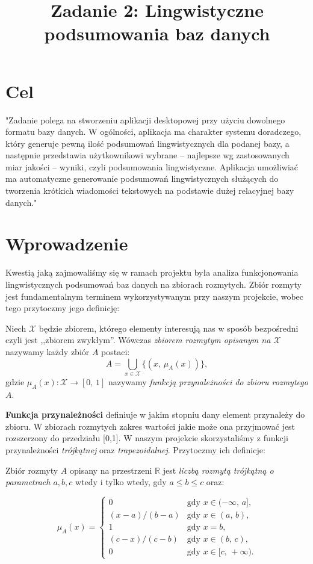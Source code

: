 \documentclass{classrep}
\author{
  \studentinfo{Piotr Traczyk}{195733} \and
  \studentinfo{Bartosz Jurczewski}{210209}
}
\title{Zadanie 2: Lingwistyczne podsumowania baz danych}
\begin{document}
\maketitle


\section{Cel}
"Zadanie polega na stworzeniu aplikacji desktopowej przy użyciu dowolnego formatu bazy danych. W ogólności, aplikacja ma charakter systemu doradczego, który generuje pewną ilość podsumowań lingwistycznych dla podanej bazy, a następnie przedstawia użytkownikowi wybrane – najlepsze wg zastosowanych miar jakości – wyniki, czyli podsumowania lingwistyczne. Aplikacja umożliwiać ma automatyczne generowanie podsumowań lingwistycznych służących do tworzenia krótkich wiadomości tekstowych na podstawie dużej relacyjnej bazy danych." \cite{tresc}

\section{Wprowadzenie}
Kwestią jaką zajmowaliśmy się w ramach projektu była analiza funkcjonowania lingwistycznych podsumowań baz danych na zbiorach rozmytych. Zbiór rozmyty jest fundamentalnym terminem wykorzystywanym przy naszym projekcie, wobec tego przytoczmy jego definicję:

\begin{definition}Niech \(\mathcal{X}\) będzie zbiorem, którego elementy interesują
nas w sposób bezpośredni czyli jest ,,zbiorem zwykłym''.
Wówczas \emph{zbiorem rozmytym opisanym na \(\mathcal{X}\)}
nazywamy każdy zbiór \(A\) postaci:
\[A = \bigcup_{x \in \mathcal{X}} \{(x,\, \mu_A(x))\},\]
gdzie \(\mu_A(x) : \mathcal{X} \to [0,\,1]\) nazywamy \emph{funkcją
przynależności do zbioru rozmytego \(A\)}.
\end{definition}

\textbf{Funkcja przynależności} definiuje w jakim stopniu dany element przynależy do zbioru. W zbiorach rozmytych zakres wartości jakie może ona przyjmować jest rozszerzony do przedziału [0,1]. W naszym projekcie skorzystaliśmy z funkcji przynależności \emph{trójkątnej} oraz \emph{trapezoidalnej}. Przytoczmy ich definicje:

\begin{definition}
Zbiór rozmyty \(A\) opisany na przestrzeni \(\mathbb{R}\) jest
\emph{liczbą rozmytą trójkątną o parametrach \(a, b, c\)} wtedy i tylko
wtedy, gdy \(a \leq b \leq c\) oraz:

\[\mu_A(x) = \begin{cases}
0                 & \mbox{gdy } x \in (-\infty,\, a], \\
(x - a) / (b - a) & \mbox{gdy } x \in (a,\, b), \\
1                 & \mbox{gdy } x = b, \\
(c - x) / (c - b) & \mbox{gdy } x \in (b,\, c), \\
0                 & \mbox{gdy } x \in [c,\, +\infty).
\end{cases}\]
\end{definition}
\end{document}
